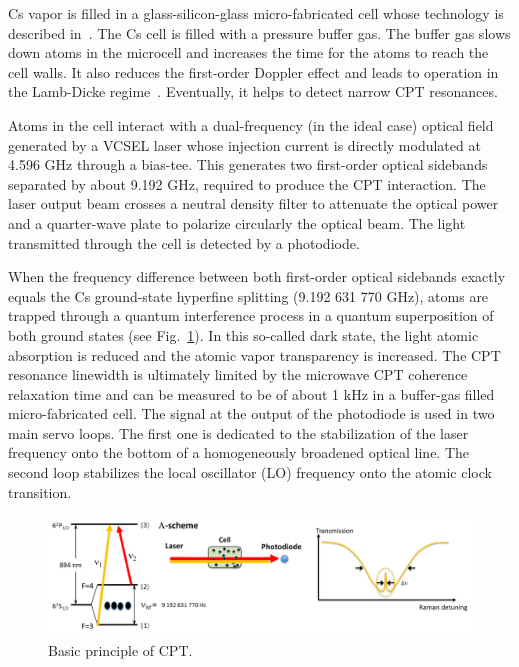 \documentclass[a4paper,12pt]{article}
\begin{document}
Cs vapor is filled in a glass-silicon-glass micro-fabricated cell whose technology is described in~\cite{hasegawa}. The Cs cell is filled with a pressure buffer gas. The buffer gas slows down atoms in the microcell and increases the time for the atoms to reach the cell walls. It also reduces the first-order Doppler effect and leads to operation in the Lamb-Dicke regime~\cite{dicke}. Eventually, it helps to detect narrow CPT resonances.

Atoms in the cell interact with a dual-frequency (in the ideal case) optical field generated by a VCSEL laser whose injection current is directly modulated at 4.596 GHz through a bias-tee. This generates two first-order optical sidebands separated by about 9.192 GHz, required to produce the CPT interaction. The laser output beam crosses a neutral density filter to attenuate the optical power and a quarter-wave plate to polarize circularly the optical beam. The light transmitted through the cell is detected by a photodiode.

When the frequency difference between both first-order optical sidebands exactly equals the Cs ground-state hyperfine splitting (9.192 631 770 GHz), atoms are trapped through a quantum interference process in a quantum superposition of both ground states (see Fig.~\ref{fig:ppeCPT}). In this so-called dark state, the light atomic absorption is reduced and the atomic vapor transparency is increased. The CPT resonance linewidth is ultimately limited by the microwave CPT coherence relaxation time and can be measured to be of about 1 kHz in a buffer-gas filled micro-fabricated cell. The signal at the output of the photodiode is used in two main servo loops. The first one is dedicated to the stabilization of the laser frequency onto the bottom of a homogeneously broadened optical line. The second loop stabilizes the local oscillator (LO) frequency onto the atomic clock transition.

\begin{figure}[h!]
	\centering
	\includegraphics[width=0.8\linewidth]{Images/ppeCPT.png}
	\caption{Basic principle of CPT.}
	\label{fig:ppeCPT}
\end{figure}

\newpage
\end{document}
